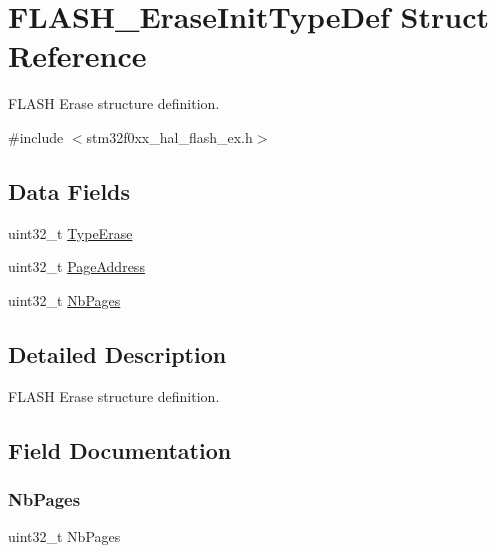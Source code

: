 \hypertarget{struct_f_l_a_s_h___erase_init_type_def}{}\section{F\+L\+A\+S\+H\+\_\+\+Erase\+Init\+Type\+Def Struct Reference}
\label{struct_f_l_a_s_h___erase_init_type_def}


F\+L\+A\+SH Erase structure definition.  




{\ttfamily \#include $<$stm32f0xx\+\_\+hal\+\_\+flash\+\_\+ex.\+h$>$}

\subsection*{Data Fields}
\begin{DoxyCompactItemize}
\item 
uint32\+\_\+t \hyperlink{struct_f_l_a_s_h___erase_init_type_def_ae2154c09320f3ef7feb8f4a84e9ac17b}{Type\+Erase}
\item 
uint32\+\_\+t \hyperlink{struct_f_l_a_s_h___erase_init_type_def_ac0d6c69c326b962d7748bf477c235b00}{Page\+Address}
\item 
uint32\+\_\+t \hyperlink{struct_f_l_a_s_h___erase_init_type_def_a883b193a78c63e993f1d70102eac64b3}{Nb\+Pages}
\end{DoxyCompactItemize}


\subsection{Detailed Description}
F\+L\+A\+SH Erase structure definition. 

\subsection{Field Documentation}
\mbox{\label{struct_f_l_a_s_h___erase_init_type_def_a883b193a78c63e993f1d70102eac64b3}} 
\subsubsection{\texorpdfstring{Nb\+Pages}{NbPages}}
{\footnotesize\ttfamily uint32\+\_\+t Nb\+Pages}

